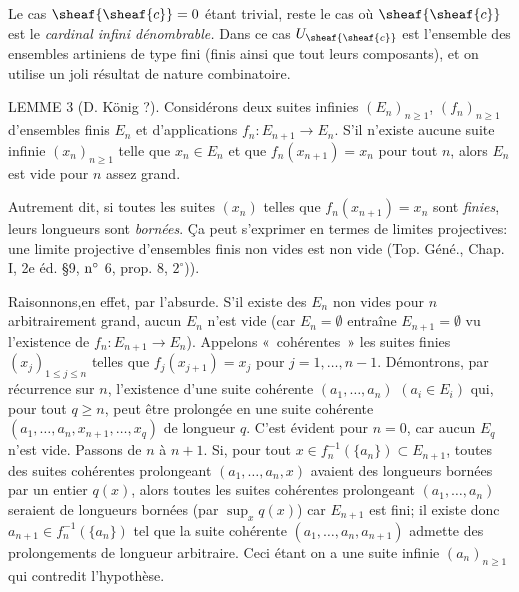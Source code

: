 Le cas $\sheaf{\sheaf{c}}=0$ étant trivial, reste le cas où
$\sheaf{\sheaf{c}}$ est le \emph{cardinal infini dénombrable.} Dans
ce cas $U_{\sheaf{\sheaf{c}}}$ est l'ensemble des ensembles
artiniens de type fini (\ie finis ainsi que tout leurs composants),
et on utilise un joli résultat de nature combinatoire.

\begin{enonce*}{LEMME 3}
{\rm (D. K\"onig ?)}. Considérons deux suites infinies $(E_n)_{n\geq
1}$, $(f_n)_{n \geq 1}$ d'ensembles finis $E_n$ et d'applications
$f_n:E_{n+1}\rightarrow E_n$. S'il n'existe aucune suite infinie
$(x_n)_{n%
\geq 1}$ telle que $x_n\in E_n$ et que $f_n(x_{n+1})=x_n$ pour tout
$n$, alors $E_n$ est vide pour $n$ assez grand.
\end{enonce*}

Autrement dit, si toutes les suites $(x_n)$ telles que
$f_n(x_{n+1})=x_n$ sont \emph{finies}, leurs longueurs sont
\emph{bornées}. \c Ca peut s'exprimer en termes de limites
projectives: une limite projective d'ensembles finis non vides est
non vide (\cf Top. Géné., Chap. I, 2e éd. \S 9, ${\rm n^{\circ}}$ 6,
prop. 8, $2^{\circ}$)).

Raisonnons,\pageoriginale en effet, par l'absurde. S'il existe des
$E_n$ non vides pour $n$ arbitrairement grand, aucun $E_n$ n'est
vide (car $E_n=∅$ entraîne $E_{n+1}=∅$ vu
l'existence de $f_n:E_{n+1}\rightarrow E_n$). Appelons
« cohérentes » les suites finies $(x_j)_{1\leq j\leq n}$ telles que
$f_j(x_{j+1})=x_j$ pour $j=1,\ldots,n-1$. Démontrons, par récurrence
sur $n$, l'existence d'une suite cohérente $(a_1,\ldots,a_n)$
$(a_i\in E_i)$ qui, pour tout $q\geq n$, peut être prolongée en une
suite cohérente $(a_1,\ldots,a_n,x_{n+1},\ldots,x_q)$ de longueur
$q$. C'est évident pour $n=0$, car aucun $E_q$ n'est vide. Passons
de $n$ à $n+1$. Si, pour tout $x\in f^{-1}_n(\{a_n\})\subset
E_{n+1}$, toutes des suites cohérentes prolongeant
$(a_1,\ldots,a_n,x)$ avaient des longueurs bornées par un entier
$q(x)$, alors toutes les suites cohérentes prolongeant
$(a_1,\ldots,a_n)$ seraient de longueurs bornées (par $\sup_x q(x)$)
car $E_{n+1}$ est fini; il existe donc $a_{n+1}\in
f^{-1}_n(\{a_n\})$ tel que la suite cohérente
$(a_1,\ldots,a_n,a_{n+1})$ admette des prolongements de longueur
arbitraire. Ceci étant on a une suite infinie $(a_n)_{n%
\geq 1}$ qui contredit l'hypothèse.

